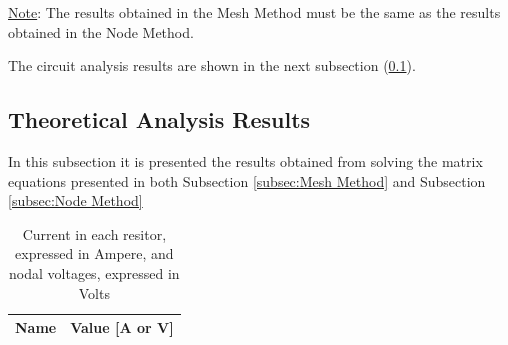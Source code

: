 \underline{Note}: The results obtained in the Mesh Method must be the same as the results obtained in the Node Method.\par

The circuit analysis results are shown in the next subsection (\ref{subsec:Theoretical Analysis Results}).


\subsection{Theoretical Analysis Results}
\label{subsec:Theoretical Analysis Results}\par
In this subsection it is presented the results obtained from solving the matrix equations presented in both Subsection \ref{subsec:Mesh Method} and Subsection \ref{subsec:Node Method}
\begin{table} [H]
  \centering
  \begin{tabular}{|l|r|}
    \hline    
    {\bf Name} & {\bf Value [A or V]} \\ \hline
    
  \end{tabular}
  \caption{Current in each resitor, expressed in Ampere, and nodal voltages, expressed in Volts}
  \label{tab:op_analysis}
\end{table}

\newpage
